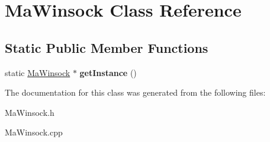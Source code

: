 \hypertarget{class_ma_winsock}{}\section{Ma\+Winsock Class Reference}
\label{class_ma_winsock}
\subsection*{Static Public Member Functions}
\begin{DoxyCompactItemize}
\item 
\mbox{\label{class_ma_winsock_a5726747da68fa06db9f630daf91621e6}} 
static \mbox{\hyperlink{class_ma_winsock}{Ma\+Winsock}} $\ast$ {\bfseries get\+Instance} ()
\end{DoxyCompactItemize}


The documentation for this class was generated from the following files\+:\begin{DoxyCompactItemize}
\item 
Ma\+Winsock.\+h\item 
Ma\+Winsock.\+cpp\end{DoxyCompactItemize}
